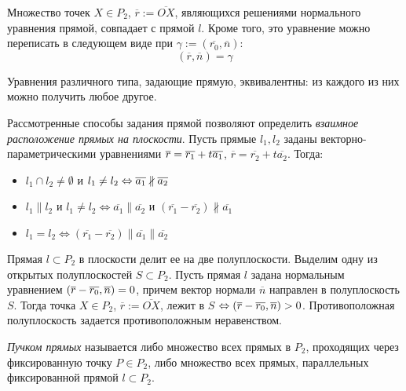 \begin{note}
	Множество точек $X \in P_2$, $\overline{r} := \overline{OX}$, являющихся решениями нормального уравнения прямой, совпадает с прямой $l$. Кроме того, это уравнение можно переписать в следующем виде при $\gamma := (\overline{r_0}, \overline{n})$:
	\[(\overline{r}, \overline{n}) = \gamma\]
\end{note}

\begin{note}
	Уравнения различного типа, задающие прямую, эквивалентны: из каждого из них можно получить любое другое.
\end{note}

\begin{note}
	Рассмотренные способы задания прямой позволяют определить \textit{взаимное расположение прямых на плоскости}. Пусть прямые $l_1, l_2$ заданы векторно-параметричес\-кими уравнениями $\overline{r} \hm{=} \overline{r_1} + t\overline{a_1}$, $\overline{r} = \overline{r_2} + t\overline{a_2}$. Тогда:
	\begin{itemize}
		\item $l_1 \cap l_2 \ne \emptyset$ и $l_1 \ne l_2 \Leftrightarrow \overline{a_1} \nparallel \overline{a_2}$
		\item $l_1 \parallel l_2$ и $l_1 \ne l_2 \Leftrightarrow \overline{a_1} \parallel \overline{a_2}$ и $(\overline{r_1} - \overline{r_2}) \nparallel \overline{a_1}$ 
		\item $l_1 = l_2 \Leftrightarrow (\overline{r_1} - \overline{r_2}) \parallel \overline{a_1} \parallel \overline{a_2}$
	\end{itemize}
\end{note}

\begin{note}
	Прямая $l \subset P_2$ в плоскости делит ее на две полуплоскости. Выделим одну из открытых полуплоскостей $S \subset P_2$. Пусть прямая $l$ задана нормальным уравнением $(\overline{r} \hm{-} \overline{r_0}, \overline{n}) = 0$, причем вектор нормали $\overline{n}$ направлен в полуплоскость $S$. Тогда точка $X \in P_2$, $\overline r := \overline{OX}$, лежит в $S$ $\Leftrightarrow (\overline{r} \hm{-} \overline{r_0}, \overline{n}) > 0$. Противоположная полуплоскость задается противоположным неравенством.
\end{note}

\begin{definition}
	\textit{Пучком прямых} называется либо множество всех прямых в $P_2$, проходящих через фиксированную точку $P \in P_2$, либо множество всех прямых, параллельных фиксированной прямой $l \subset P_2$.
\end{definition}

